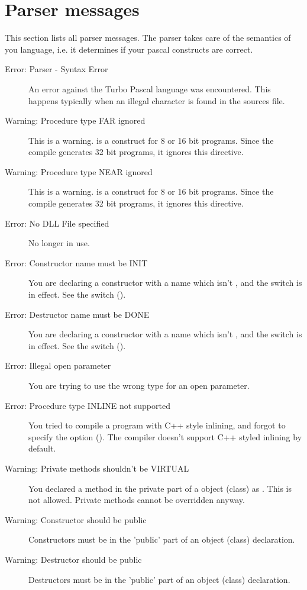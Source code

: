  \section{Parser messages}
 This section lists all parser messages. The parser takes care of the
 semantics of you language, i.e. it determines if your pascal constructs
 are correct.
 \begin{description}
\item [Error: Parser - Syntax Error]
 An error against the Turbo Pascal language was encountered. This happens
 typically when an illegal character is found in the sources file.
\item [Warning: Procedure type FAR ignored]
 This is a warning.  is a construct for 8 or 16 bit programs. Since
 the compile generates 32 bit programs, it ignores this directive.
\item [Warning: Procedure type NEAR ignored]
 This is a warning.  is a construct for 8 or 16 bit programs. Since
 the compile generates 32 bit programs, it ignores this directive.
\item [Error: No DLL File specified]
 No longer in use.
\item [Error: Constructor name must be INIT]
 You are declaring a constructor with a name which isn't , and the
  switch is in effect. See the  switch (). 
\item [Error: Destructor name must be DONE]
 You are declaring a constructor with a name which isn't , and the
  switch is in effect. See the  switch (). 
\item [Error: Illegal open parameter]
 You are trying to use the wrong type for an open parameter.
\item [Error: Procedure type INLINE not supported]
 You tried to compile a program with C++ style inlining, and forgot to
 specify the  option (). The compiler doesn't support C++
 styled inlining by default. 
\item [Warning: Private methods shouldn't be VIRTUAL]
 You declared a method in the private part of a object (class) as
 . This is not allowed. Private methods cannot be overridden
 anyway.
\item [Warning: Constructor should be public]
 Constructors must be in the 'public' part of an object (class) declaration. 
\item [Warning: Destructor should be public]
 Destructors must be in the 'public' part of an object (class) declaration. 

\end{description}
